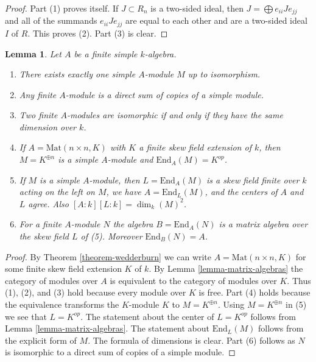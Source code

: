 \documentclass{stacks-project}
\theoremstyle{plain}
\newtheorem{lemma}[subsection]{Lemma}
\theoremstyle{definition}
\theoremstyle{remark}
\numberwithin{equation}{subsection}
\begin{document}
\begin{proof}
Part (1) proves itself. If $J \subset R_n$ is a two-sided ideal, then
$J = \bigoplus e_{ii}Je_{jj}$ and all of the summands $e_{ii}Je_{jj}$ are
equal to each other and are a two-sided ideal $I$ of $R$. This proves (2).
Part (3) is clear.
\end{proof}

\begin{lemma}
\label{lemma-simple-module-unique}
Let $A$ be a finite simple $k$-algebra.
\begin{enumerate}
\item There exists exactly one simple $A$-module $M$ up to isomorphism.
\item Any finite $A$-module is a direct sum of copies of a simple module.
\item Two finite $A$-modules are isomorphic if and only if they
have the same dimension over $k$.
\item If $A = \text{Mat}(n \times n, K)$ with $K$ a finite skew field
extension of $k$, then $M = K^{\oplus n}$ is a simple $A$-module and
$\text{End}_A(M) = K^{op}$.
\item If $M$ is a simple $A$-module, then $L = \text{End}_A(M)$
is a skew field finite over $k$ acting on the left on $M$, we have
$A = \text{End}_L(M)$, and the centers of $A$ and $L$ agree.
Also $[A : k] [L : k] = \dim_k(M)^2$.
\item For a finite $A$-module $N$ the algebra $B = \text{End}_A(N)$ is a
matrix algebra over the skew field $L$ of (5). Moreover $\text{End}_B(N) = A$.
\end{enumerate}
\end{lemma}

\begin{proof}
By
Theorem \ref{theorem-wedderburn}
we can write $A = \text{Mat}(n \times n, K)$ for some finite skew
field extension $K$ of $k$. By
Lemma \ref{lemma-matrix-algebras}
the category of modules over $A$ is equivalent to the category of
modules over $K$. Thus (1), (2), and (3) hold
because every module over $K$ is free. Part (4) holds
because the equivalence transforms the $K$-module $K$
to $M = K^{\oplus n}$. Using $M = K^{\oplus n}$ in (5)
we see that $L = K^{op}$. The statement about the center of $L = K^{op}$
follows from
Lemma \ref{lemma-matrix-algebras}.
The statement about $\text{End}_L(M)$ follows from the explicit form
of $M$. The formula of dimensions is clear.
Part (6) follows as $N$ is isomorphic to a direct sum of
copies of a simple module.
\end{proof}
\end{document}
